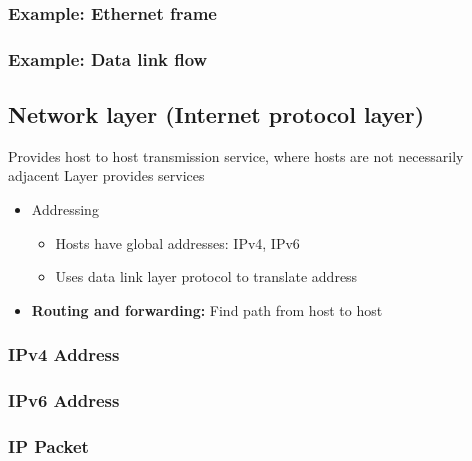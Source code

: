 \documentclass{report}
\begin{document}
     \subsubsection{Example: Ethernet frame}
     \bigbreak \noindent 
     \bigbreak \noindent 
     \subsubsection{Example: Data link flow}
     \bigbreak \noindent 

     \bigbreak \noindent 
     \subsection{Network layer (Internet protocol layer)}
     \bigbreak \noindent 
     Provides host to host transmission service, where hosts are not necessarily adjacent
     \bigbreak \noindent 
     Layer provides services
     \begin{itemize}
         \item Addressing
             \begin{itemize}
                 \item Hosts have global addresses: IPv4, IPv6
                    \item Uses data link layer protocol to translate address
             \end{itemize}
         \item \textbf{Routing and forwarding:} Find path from host to host
     \end{itemize}
     \bigbreak \noindent 
     \subsubsection{IPv4 Address}
     \bigbreak \noindent 

     \bigbreak \noindent 
     \subsubsection{IPv6 Address}
     \bigbreak \noindent 
     \bigbreak \noindent 
     \subsubsection{IP Packet}
     \bigbreak \noindent 

     \bigbreak \noindent 
\end{document}
